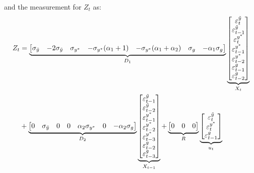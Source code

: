 \documentclass[a4paper,12pt]{article}
\begin{document}
$\allowbreak $and the measurement for $Z_{t}$ as:%
\begin{align*}
Z_{t}& =\underbrace{%
\begin{bmatrix}
\sigma _{\tilde{y}} & -2\sigma _{\tilde{y}} & \sigma _{y^{\ast }} & -\sigma
_{y^{\ast }}(\alpha _{1}+1) & -\sigma _{y^{\ast }}(\alpha _{1}+\alpha _{2})
& \sigma _{g} & -\alpha _{1}\sigma _{g}%
\end{bmatrix}%
}_{D_{1}}\underbrace{%
\begin{bmatrix}
\varepsilon _{t}^{\tilde{y}} \\ 
\varepsilon _{t-1}^{\tilde{y}} \\ 
\varepsilon _{t}^{y^{\ast }} \\ 
\varepsilon _{t-1}^{y^{\ast }} \\ 
\varepsilon _{t-2}^{y^{\ast }} \\ 
\varepsilon _{t-1}^{g} \\ 
\varepsilon _{t-2}^{g}%
\end{bmatrix}%
}_{X_{t}} \\
& +\underbrace{%
\begin{bmatrix}
0 & \sigma _{\tilde{y}} & 0 & 0 & \alpha _{2}\sigma _{y^{\ast }} & 0 & 
-\alpha _{2}\sigma _{g}%
\end{bmatrix}%
}_{D_{2}}\underbrace{%
\begin{bmatrix}
\varepsilon _{t-1}^{\tilde{y}} \\ 
\varepsilon _{t-2}^{\tilde{y}} \\ 
\varepsilon _{t-1}^{y^{\ast }} \\ 
\varepsilon _{t-2}^{y^{\ast }} \\ 
\varepsilon _{t-3}^{y^{\ast }} \\ 
\varepsilon _{t-2}^{g} \\ 
\varepsilon _{t-3}^{g}%
\end{bmatrix}%
}_{X_{t-1}}+\underbrace{%
\begin{bmatrix}
0 & 0 & 0%
\end{bmatrix}%
}_{R}\underbrace{%
\begin{bmatrix}
\varepsilon _{t}^{\tilde{y}} \\ 
\varepsilon _{t}^{y^{\ast }} \\ 
\varepsilon _{t-1}^{g}%
\end{bmatrix}%
}_{u_{t}}
\end{align*}
\end{document}
